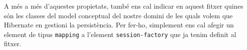 A més a més d'aquestes propietats, també ens cal indicar en aquest fitxer quines són les classes del model conceptual del nostre domini de les quals volem que Hibernate en gestioni la persistència. Per fer-ho, simplement ens cal afegir un element de tipus \texttt{mapping} a l'element \texttt{session-factory} que ja tenim definit al fitxer.







